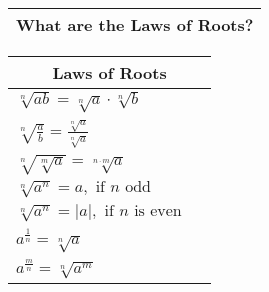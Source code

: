 
\begin{small}
    \begin{tabularx}{1\textwidth}{
            p{}
        }
        \toprule
        What are the Laws of Roots?
        \\
        \bottomrule

    \end{tabularx}
\end{small}

\begin{tabularx}{1\textwidth}{
        p{}
        p{}
    }
    \toprule
    \multicolumn{2}{c}{\textbf{Laws of Roots}} \\
    \midrule
    $ \sqrt[n]{ab} = \sqrt[n]{a} \cdot \sqrt[n]{b} $ & \\
    \midrule

    $ \sqrt[n]{ \frac{a}{b} } = \frac{ \sqrt[n]{a} }{ \sqrt[n]{a} } $ & \\
    \midrule

    $ \sqrt[n]{ \sqrt[m]{a}} = \sqrt[n \cdot m]{a} $ & \\
    \midrule

    $ \sqrt[n]{ a^{n} } = a, \text{ if } n \text{ odd } $ & \\
    \midrule

    $ \sqrt[n]{ a^{n} } = \lvert a \rvert, \text{ if } n \text{ is even } $ &
    \\
    \midrule

    $ a^{ \frac{1}{n} } = \sqrt[n]{a} $ & \\
    \midrule

    $ a^{ \frac{m}{n} } = \sqrt[n]{ a^{m} } $ & \\
    \bottomrule
\end{tabularx}
